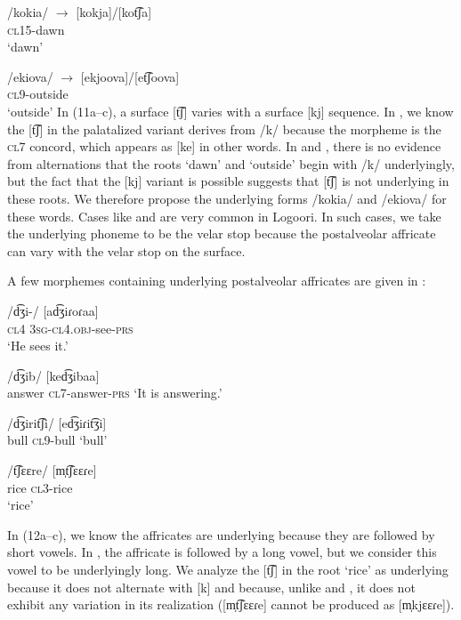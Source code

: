 \documentclass[output=paper]{langsci/langscibook}
\begin{document}
\ex\label{ex:glewwe:11b}{}
 /kokia/    $\rightarrow$  [kokja]/[kot͡ʃa]\\{}
\textsc{cl15}-dawn\\{}
\glt ‘dawn’

\ex\label{ex:glewwe:11c}{}
 /ekiova/  $\rightarrow$  [ekjoova]/[et͡ʃoova]\\{}
\textsc{cl9}-outside\\{}
\glt ‘outside’
\z
\z 
In (11a–c), a surface [t͡ʃ] varies with a surface [kj] sequence. In , we know the [t͡ʃ] in the palatalized variant derives from /k/ because the morpheme is the \textsc{cl}7 concord, which appears as [ke] in other words. In  and , there is no evidence from alternations that the roots ‘dawn’ and ‘outside’ begin with /k/ underlyingly, but the fact that the [kj] variant is possible suggests that [t͡ʃ] is not underlying in these roots. We therefore propose the underlying forms /kokia/ and /ekiova/ for these words. Cases like  and  are very common in Logoori. In such cases, we take the underlying phoneme to be the velar stop because the postalveolar affricate can vary with the velar stop on the surface. 

A few morphemes containing underlying postalveolar affricates are given in :

\ea\label{ex:glewwe:12}{}
  \ea\label{ex:glewwe:12a}
 /d͡ʒi-/  [ad͡ʒiɾoɾaa]\\{}
\textsc{cl}4  3\textsc{sg}-\textsc{cl}4.\textsc{obj}-see-\textsc{prs}\\{}
\glt ‘He sees it.’

\ex\label{ex:glewwe:12b}{}
 /d͡ʒib/  [ked͡ʒibaa]\\{}
answer  \textsc{cl7}-answer-\textsc{prs}
\glt ‘It is answering.’

\ex\label{ex:glewwe:12c}{}
 /d͡ʒirit͡ʃi/  [ed͡ʒiɾit͡ʒi]\\{}
bull  \textsc{cl9}-bull
    ‘bull’

\ea\label{ex:glewwe:12d}{}
 /t͡ʃɛɛre/  [m̩t͡ʃɛɛɾe]\\{}
rice  \textsc{cl3}-rice\\{}
\glt    ‘rice’
\z
\z 

In (12a–c), we know the affricates are underlying because they are followed by short vowels. In , the affricate is followed by a long vowel, but we consider this vowel to be underlyingly long. We analyze the [t͡ʃ] in the root ‘rice’ as underlying because it does not alternate with [k] and because, unlike  and , it does not exhibit any variation in its realization ([m̩t͡ʃɛɛɾe] cannot be produced as [m̩kjɛɛɾe]).
\end{document}
